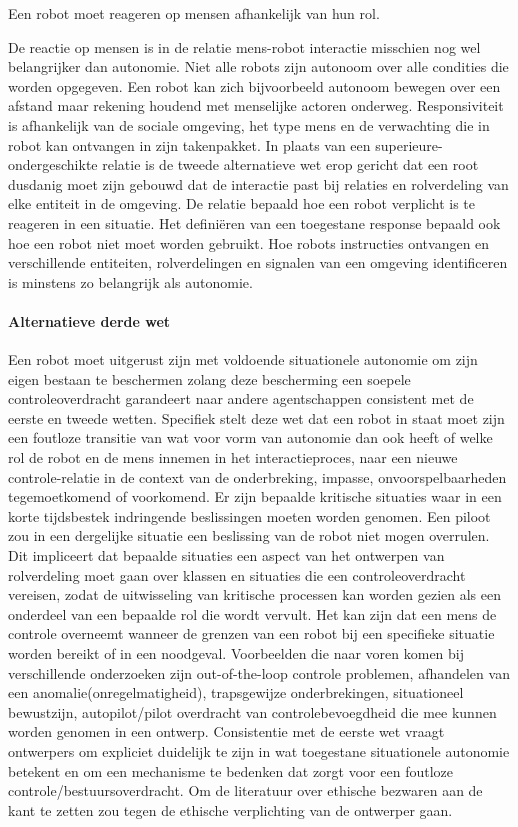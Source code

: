 \documentclass[11pt]{report}
\begin{document}
Een robot moet reageren op mensen afhankelijk van hun rol.

De reactie op mensen is in de relatie mens-robot interactie misschien nog wel belangrijker dan autonomie. Niet alle robots zijn autonoom over alle condities die worden opgegeven. Een robot kan zich bijvoorbeeld autonoom bewegen over een afstand maar rekening houdend met menselijke actoren onderweg. Responsiviteit is afhankelijk van de sociale omgeving, het type mens en de verwachting die in robot kan ontvangen in zijn takenpakket. In plaats van een superieure-ondergeschikte relatie is de tweede alternatieve wet erop gericht dat een root dusdanig moet zijn gebouwd dat de interactie past bij relaties en rolverdeling van elke entiteit in de omgeving. De relatie bepaald hoe een robot verplicht is te reageren in een situatie. Het definiëren van een toegestane response bepaald ook hoe een robot niet moet worden gebruikt.
Hoe robots instructies ontvangen en verschillende entiteiten, rolverdelingen en signalen van een omgeving identificeren is minstens zo belangrijk als autonomie.
\paragraph{Alternatieve derde wet}

Een robot moet uitgerust zijn met voldoende situationele autonomie om zijn eigen bestaan te beschermen zolang deze bescherming een soepele controleoverdracht garandeert naar andere agentschappen consistent met de eerste en tweede wetten.
Specifiek stelt deze wet dat een robot in staat moet zijn  een foutloze transitie van wat voor vorm van autonomie dan ook heeft of welke rol de robot en de mens innemen in het interactieproces, naar een nieuwe controle-relatie in de context van de onderbreking, impasse, onvoorspelbaarheden tegemoetkomend of voorkomend.
Er zijn bepaalde kritische situaties waar in een korte tijdsbestek indringende beslissingen moeten worden genomen. Een piloot zou in een dergelijke situatie een beslissing van de robot niet mogen overrulen. Dit impliceert dat bepaalde situaties een aspect van het ontwerpen van rolverdeling moet gaan over klassen en situaties die een controleoverdracht vereisen, zodat de uitwisseling van kritische processen kan worden gezien als een onderdeel van een bepaalde rol die wordt vervult. Het kan zijn dat een mens de controle overneemt wanneer de grenzen van een robot bij een specifieke situatie worden bereikt of in een noodgeval. Voorbeelden die naar voren komen bij verschillende onderzoeken zijn out-of-the-loop controle problemen, afhandelen van een anomalie(onregelmatigheid), trapsgewijze onderbrekingen, situationeel bewustzijn, autopilot/pilot overdracht van controlebevoegdheid die mee kunnen worden genomen in een ontwerp.
Consistentie met de eerste wet vraagt ontwerpers om expliciet duidelijk te zijn in wat toegestane situationele autonomie betekent en om een mechanisme te bedenken dat zorgt voor een foutloze controle/bestuursoverdracht. Om de literatuur over ethische bezwaren aan de kant te zetten zou tegen de ethische verplichting van de ontwerper gaan.
\end{document}

